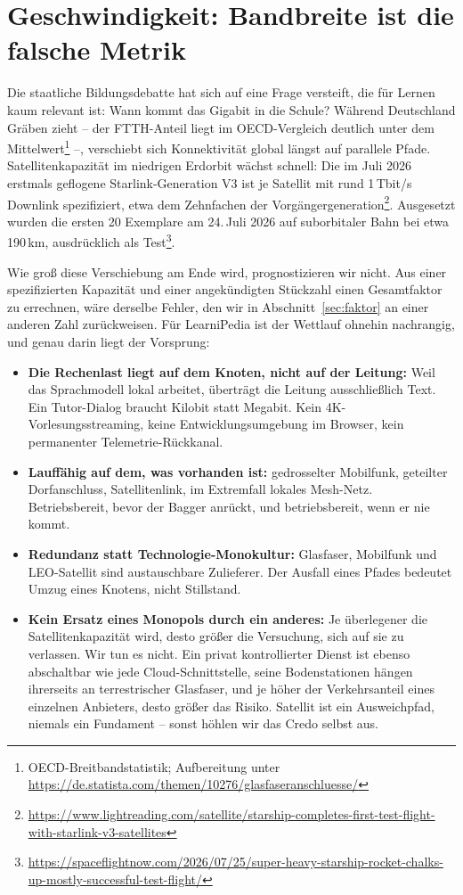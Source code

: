 \documentclass[11pt,a4paper]{article}
\begin{document}
\section{Geschwindigkeit: Bandbreite ist die falsche Metrik}
Die staatliche Bildungsdebatte hat sich auf eine Frage versteift, die für Lernen kaum relevant ist: Wann kommt das Gigabit in die Schule? Während Deutschland Gräben zieht -- der FTTH-Anteil liegt im OECD-Vergleich deutlich unter dem Mittelwert\footnote{OECD-Breitbandstatistik; Aufbereitung unter \url{https://de.statista.com/themen/10276/glasfaseranschluesse/}} --, verschiebt sich Konnektivität global längst auf parallele Pfade. Satellitenkapazität im niedrigen Erdorbit wächst schnell: Die im Juli 2026 erstmals geflogene Starlink-Generation V3 ist je Satellit mit rund 1\,Tbit/s Downlink spezifiziert, etwa dem Zehnfachen der Vorgängergeneration\footnote{\url{https://www.lightreading.com/satellite/starship-completes-first-test-flight-with-starlink-v3-satellites}}. Ausgesetzt wurden die ersten 20 Exemplare am 24.\,Juli 2026 auf suborbitaler Bahn bei etwa 190\,km, ausdrücklich als Test\footnote{\url{https://spaceflightnow.com/2026/07/25/super-heavy-starship-rocket-chalks-up-mostly-successful-test-flight/}}.

\noindent Wie groß diese Verschiebung am Ende wird, prognostizieren wir nicht. Aus einer spezifizierten Kapazität und einer angekündigten Stückzahl einen Gesamtfaktor zu errechnen, wäre derselbe Fehler, den wir in Abschnitt~\ref{sec:faktor} an einer anderen Zahl zurückweisen. Für LearniPedia ist der Wettlauf ohnehin nachrangig, und genau darin liegt der Vorsprung:

\begin{itemize}[label=--]
    \item \textbf{Die Rechenlast liegt auf dem Knoten, nicht auf der Leitung:} Weil das Sprachmodell lokal arbeitet, überträgt die Leitung ausschließlich Text. Ein Tutor-Dialog braucht Kilobit statt Megabit. Kein 4K-Vorlesungsstreaming, keine Entwicklungsumgebung im Browser, kein permanenter Telemetrie-Rückkanal.
    \item \textbf{Lauffähig auf dem, was vorhanden ist:} gedrosselter Mobilfunk, geteilter Dorfanschluss, Satellitenlink, im Extremfall lokales Mesh-Netz. Betriebsbereit, bevor der Bagger anrückt, und betriebsbereit, wenn er nie kommt.
    \item \textbf{Redundanz statt Technologie-Monokultur:} Glasfaser, Mobilfunk und LEO-Satellit sind austauschbare Zulieferer. Der Ausfall eines Pfades bedeutet Umzug eines Knotens, nicht Stillstand.
    \item \textbf{Kein Ersatz eines Monopols durch ein anderes:} Je überlegener die Satellitenkapazität wird, desto größer die Versuchung, sich auf sie zu verlassen. Wir tun es nicht. Ein privat kontrollierter Dienst ist ebenso abschaltbar wie jede Cloud-Schnittstelle, seine Bodenstationen hängen ihrerseits an terrestrischer Glasfaser, und je höher der Verkehrsanteil eines einzelnen Anbieters, desto größer das Risiko. Satellit ist ein Ausweichpfad, niemals ein Fundament -- sonst höhlen wir das Credo selbst aus.
\end{itemize}
\end{document}
